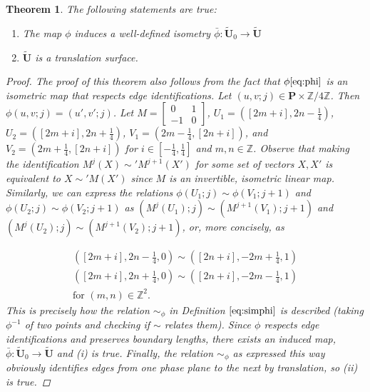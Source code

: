 \documentclass[]{article}
\newtheorem{thm}{Theorem}[subsection]
\begin{document}
\begin{thm}{The following statements are true:}
\begin{enumerate}[label=(\roman*)]
\item The map $\phi$ induces a well-defined isometry $\bar{\phi}:\tilde{\mathbf{U}}_0 \rightarrow \tilde{\mathbf{U}}$
\item $\tilde{\mathbf{U}}$ is a translation surface.
\end{enumerate}
\begin{proof}
The proof of this theorem also follows from the fact that $\phi \eqref{eq:phi}$ is an isometric map that respects edge identifications. Let $(u,v;j)\in\mathbf{P}\times\mathbb{Z}/4\mathbb{Z}$. Then $\phi(u,v;j)=(u',v';j)$. Let $M=\left[\begin{matrix}
0 & 1\\
-1 & 0
\end{matrix}\right]$, $U_1=([2m+i],2n-\frac{1}{4})$, $U_2=([2m+i],2n+\frac{1}{4})$, $V_1=(2m-\frac{1}{4},[2n+i])$, and $V_2=(2m+\frac{1}{4},[2n+i])$ for $i\in[-\frac{1}{4},\frac{1}{4}]$ and $m,n\in\mathbb{Z}$. Observe that making the identification $M^{j}(X)\sim' M^{j+1}(X')$ for some set of vectors $X,X'$ is equivalent to $X\sim' M(X')$ since $M$ is an invertible, isometric linear map. Similarly, we can express the relations $\phi(U_1;j)\sim\phi(V_1;j+1)$ and $\phi(U_2;j)\sim\phi(V_2;j+1)$ as $(M^{j}(U_1);j)\sim (M^{j+1}(V_1);j+1)$ and $(M^{j}(U_2);j)\sim (M^{j+1}(V_2);j+1)$, or, more concisely, as

\begin{multline*}
([2m+i], 2n-\frac{1}{4},0)\sim([2n+i],-2m+\frac{1}{4},1)\\
([2m+i], 2n+\frac{1}{4},0)\sim([2n+i],-2m-\frac{1}{4},1)\\
\text{for } (m,n) \in \mathbb{Z}^{2}.
\end{multline*}
This is precisely how the relation $\sim_{\phi}$ in Definition $\eqref{eq:simphi}$ is described (taking $\phi^{-1}$ of two points and checking if $\sim$ relates them).  Since $\phi$ respects edge identifications and preserves boundary lengths, there exists an induced map, $\bar{\phi}:\tilde{\mathbf{U}}_0 \rightarrow \tilde{\mathbf{U}}$ and \emph{(i)} is true. Finally, the relation $\sim_{\phi}$ as expressed this way obviously identifies edges from one phase plane to the next by translation, so \emph{(ii)} is true.
\end{proof}
\end{thm}

\end{document}
